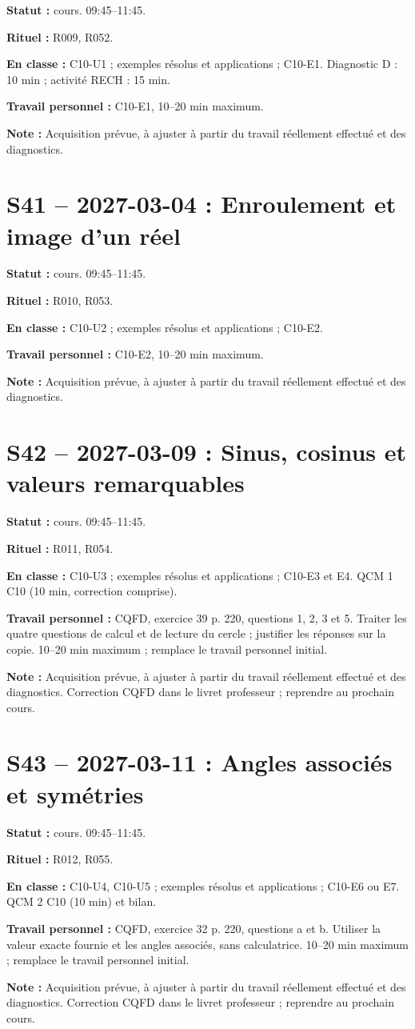 \textbf{Statut :} cours. 09:45–11:45.\par\textbf{Rituel :} R009, R052.\par\textbf{En classe :} C10-U1 ; exemples résolus et applications ; C10-E1. Diagnostic D : 10 min ; activité RECH : 15 min.\par\textbf{Travail personnel :} C10-E1, 10–20 min maximum.\par\textbf{Note :} Acquisition prévue, à ajuster à partir du travail réellement effectué et des diagnostics.
\section*{S41 -- 2027-03-04 : Enroulement et image d’un réel}
\textbf{Statut :} cours. 09:45–11:45.\par\textbf{Rituel :} R010, R053.\par\textbf{En classe :} C10-U2 ; exemples résolus et applications ; C10-E2. \par\textbf{Travail personnel :} C10-E2, 10–20 min maximum.\par\textbf{Note :} Acquisition prévue, à ajuster à partir du travail réellement effectué et des diagnostics.
\section*{S42 -- 2027-03-09 : Sinus, cosinus et valeurs remarquables}
\textbf{Statut :} cours. 09:45–11:45.\par\textbf{Rituel :} R011, R054.\par\textbf{En classe :} C10-U3 ; exemples résolus et applications ; C10-E3 et E4.  QCM 1 C10 (10 min, correction comprise).\par\textbf{Travail personnel :} CQFD, exercice 39 p. 220, questions 1, 2, 3 et 5. Traiter les quatre questions de calcul et de lecture du cercle ; justifier les réponses sur la copie. 10–20 min maximum ; remplace le travail personnel initial.\par\textbf{Note :} Acquisition prévue, à ajuster à partir du travail réellement effectué et des diagnostics. Correction CQFD dans le livret professeur ; reprendre au prochain cours.
\section*{S43 -- 2027-03-11 : Angles associés et symétries}
\textbf{Statut :} cours. 09:45–11:45.\par\textbf{Rituel :} R012, R055.\par\textbf{En classe :} C10-U4, C10-U5 ; exemples résolus et applications ; C10-E6 ou E7.  QCM 2 C10 (10 min) et bilan.\par\textbf{Travail personnel :} CQFD, exercice 32 p. 220, questions a et b. Utiliser la valeur exacte fournie et les angles associés, sans calculatrice. 10–20 min maximum ; remplace le travail personnel initial.\par\textbf{Note :} Acquisition prévue, à ajuster à partir du travail réellement effectué et des diagnostics. Correction CQFD dans le livret professeur ; reprendre au prochain cours.
